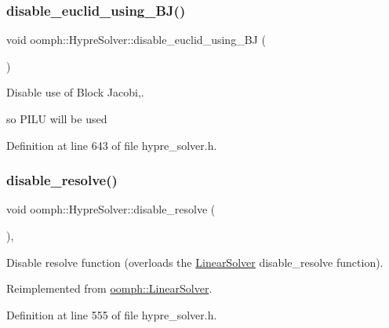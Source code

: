 \subsubsection{\texorpdfstring{disable\+\_\+euclid\+\_\+using\+\_\+\+B\+J()}{disable\_euclid\_using\_BJ()}}
{\footnotesize\ttfamily void oomph\+::\+Hypre\+Solver\+::disable\+\_\+euclid\+\_\+using\+\_\+\+BJ (\begin{DoxyParamCaption}{ }\end{DoxyParamCaption})\hspace{0.3cm}{\ttfamily [inline]}}



Disable use of Block Jacobi,. 

so P\+I\+LU will be used 

Definition at line 643 of file hypre\+\_\+solver.\+h.

\mbox{\label{classoomph_1_1HypreSolver_ae8949856fc75ff767f1ad940a710109f}} 
\subsubsection{\texorpdfstring{disable\+\_\+resolve()}{disable\_resolve()}}
{\footnotesize\ttfamily void oomph\+::\+Hypre\+Solver\+::disable\+\_\+resolve (\begin{DoxyParamCaption}{ }\end{DoxyParamCaption})\hspace{0.3cm}{\ttfamily [inline]}, {\ttfamily [virtual]}}



Disable resolve function (overloads the \hyperlink{classoomph_1_1LinearSolver}{Linear\+Solver} disable\+\_\+resolve function). 



Reimplemented from \hyperlink{classoomph_1_1LinearSolver_ad61c63af94c5961830bd9807225a48d6}{oomph\+::\+Linear\+Solver}.



Definition at line 555 of file hypre\+\_\+solver.\+h.

\mbox{\label{classoomph_1_1HypreSolver_ae917113f255b23448210530b00f55338}} 
